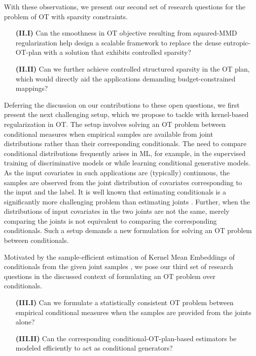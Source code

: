 With these observations, we present our second set of research questions for the problem of OT with sparsity constraints.
\begin{definitionBoxIntro}
\begin{enumerate}[labelwidth=1em, leftmargin=1em, align=left]
\item[\textbf{(II.I)}] Can the smoothness in OT objective resulting from squared-MMD regularization help design a scalable framework to replace the dense entropic-OT-plan with a solution that exhibits controlled sparsity?
\item[\textbf{(II.II)}] Can we further achieve controlled structured sparsity in the OT plan, which would directly aid the applications demanding budget-constrained mappings?
\end{enumerate}
\end{definitionBoxIntro}
Deferring the discussion on our contributions to these open questions, we first present the next challenging setup, which we propose to tackle with kernel-based regularization in OT. The setup involves solving an OT problem between conditional measures when empirical samples are available from joint distributions rather than their corresponding conditionals. The need to compare conditional distributions frequently arises in ML, for example, in the supervised training of discriminative models or while learning conditional generative models. As the input covariates in such applications are (typically) continuous, the samples are observed from the joint distribution of covariates corresponding to the input and the label. It is well known that estimating conditionals is a significantly more challenging problem than estimating joints \citep[Sec. 2]{LiNeykovBalakrishnan}. Further, when the distributions of input covariates in the two joints are not the same, merely comparing the joints is not equivalent to comparing the corresponding conditionals. Such a setup demands a new formulation for solving an OT problem between conditionals.

Motivated by the sample-efficient estimation of Kernel Mean Embeddings of conditionals from the given joint samples \citep{gretton}, we pose our third set of research questions in the discussed context of formulating an OT problem over conditionals.
\begin{definitionBoxIntro}
    \begin{enumerate}[labelwidth=1em, leftmargin=1em, align=left]
    \item[\textbf{(III.I)}] Can we formulate a statistically consistent OT problem between empirical conditional measures when the samples are provided from the joints alone?
    \item[\textbf{(III.II)}] Can the corresponding conditional-OT-plan-based estimators be modeled efficiently to act as conditional generators?
    \end{enumerate}
\end{definitionBoxIntro}

